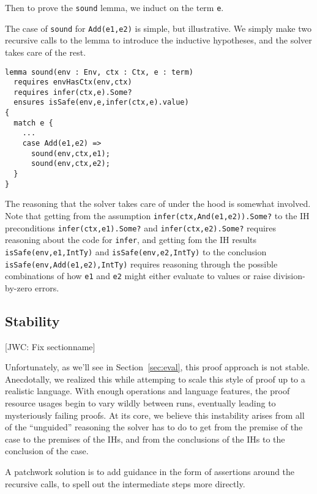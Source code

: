 \documentclass[sigplan,review,screen,anonymous]{acmart}
\newcommand{\comm}[3]{\textcolor{#1}{[#2: #3]}}
\newcommand{\jwc}[1]{\comm{dkgreen}{JWC}{#1}}
\begin{document}
Then to prove the \texttt{sound} lemma, we induct on the term \texttt{e}.

The case of \texttt{sound} for \texttt{Add(e1,e2)} is simple, but illustrative.
We simply make two recursive calls to the lemma to introduce the inductive hypotheses,
and the solver takes care of the rest. 

\begin{verbatim}
lemma sound(env : Env, ctx : Ctx, e : term)
  requires envHasCtx(env,ctx)
  requires infer(ctx,e).Some?
  ensures isSafe(env,e,infer(ctx,e).value)
{
  match e {
    ...
    case Add(e1,e2) =>
      sound(env,ctx,e1);
      sound(env,ctx,e2);
  }
}
\end{verbatim}

The reasoning that the solver takes care of under the hood is somewhat involved.
Note that getting from the assumption \texttt{infer(ctx,And(e1,e2)).Some?} to
the IH preconditions \texttt{infer(ctx,e1).Some?} and
\texttt{infer(ctx,e2).Some?} requires reasoning about the code for
\texttt{infer}, and getting fom the IH results \texttt{isSafe(env,e1,IntTy)} and
\texttt{isSafe(env,e2,IntTy)} to the conclusion
\texttt{isSafe(env,Add(e1,e2),IntTy)} requires reasoning through the possible
combinations of how \texttt{e1} and \texttt{e2} might either evaluate to values or
raise division-by-zero errors.

\subsection*{Stability}
\jwc{Fix sectionname}

Unfortunately, as we'll see in Section~\ref{sec:eval}, this proof approach is
not stable.  Anecdotally, we realized this while attemping to scale this style
of proof up to a realistic language.  With enough operations and language
features, the proof resource usages begin to vary wildly between runs,
eventually leading to mysteriously failing proofs. At its core, we believe this
instability arises from all of the ``unguided'' reasoning the solver has to do
to get from the premise of the case to the premises of the IHs, and from the
conclusions of the IHs to the conclusion of the case.

A patchwork solution is to add guidance in the form of assertions around the
recursive calls, to spell out the intermediate steps more directly.
\end{document}
